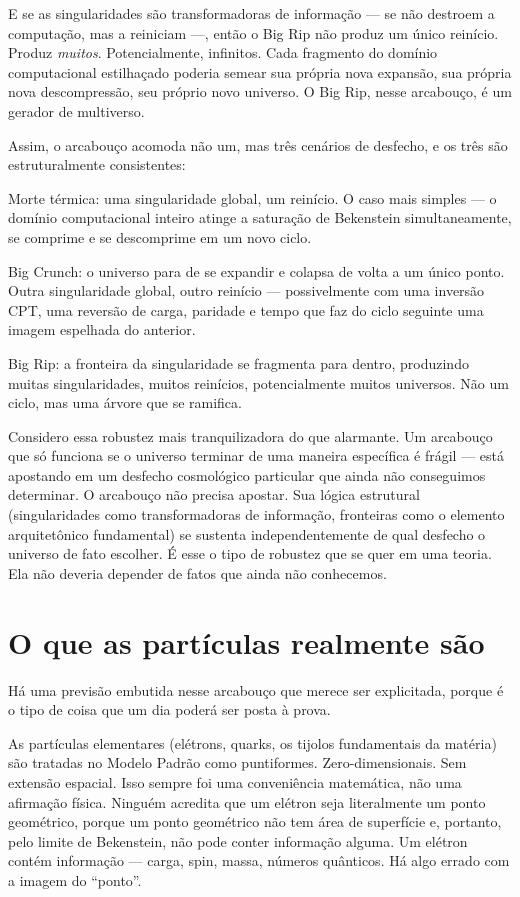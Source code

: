 \documentclass[11pt, twoside, openright]{book}
\begin{document}
E se as singularidades são transformadoras de informação --- se não destroem a computação, mas a reiniciam ---, então o Big Rip não produz um único reinício. Produz \textit{muitos}. Potencialmente, infinitos. Cada fragmento do domínio computacional estilhaçado poderia semear sua própria nova expansão, sua própria nova descompressão, seu próprio novo universo. O Big Rip, nesse arcabouço, é um gerador de multiverso.

Assim, o arcabouço acomoda não um, mas três cenários de desfecho, e os três são estruturalmente consistentes:

Morte térmica: uma singularidade global, um reinício. O caso mais simples --- o domínio computacional inteiro atinge a saturação de Bekenstein simultaneamente, se comprime e se descomprime em um novo ciclo.

Big Crunch: o universo para de se expandir e colapsa de volta a um único ponto. Outra singularidade global, outro reinício --- possivelmente com uma inversão CPT, uma reversão de carga, paridade e tempo que faz do ciclo seguinte uma imagem espelhada do anterior.

Big Rip: a fronteira da singularidade se fragmenta para dentro, produzindo muitas singularidades, muitos reinícios, potencialmente muitos universos. Não um ciclo, mas uma árvore que se ramifica.

Considero essa robustez mais tranquilizadora do que alarmante. Um arcabouço que só funciona se o universo terminar de uma maneira específica é frágil --- está apostando em um desfecho cosmológico particular que ainda não conseguimos determinar. O arcabouço não precisa apostar. Sua lógica estrutural (singularidades como transformadoras de informação, fronteiras como o elemento arquitetônico fundamental) se sustenta independentemente de qual desfecho o universo de fato escolher. É esse o tipo de robustez que se quer em uma teoria. Ela não deveria depender de fatos que ainda não conhecemos.


\section*{O que as partículas realmente são}

Há uma previsão embutida nesse arcabouço que merece ser explicitada, porque é o tipo de coisa que um dia poderá ser posta à prova.

As partículas elementares (elétrons, quarks, os tijolos fundamentais da matéria) são tratadas no Modelo Padrão como puntiformes. Zero-dimensionais. Sem extensão espacial. Isso sempre foi uma conveniência matemática, não uma afirmação física. Ninguém acredita que um elétron seja literalmente um ponto geométrico, porque um ponto geométrico não tem área de superfície e, portanto, pelo limite de Bekenstein, não pode conter informação alguma. Um elétron contém informação --- carga, spin, massa, números quânticos. Há algo errado com a imagem do ``ponto''.
\end{document}
